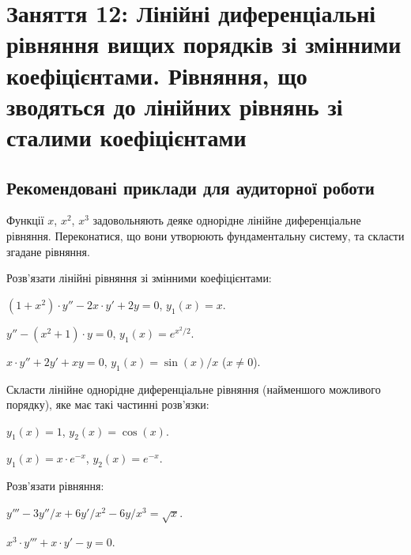 \section*{Заняття 12: Лінійні диференціальні рівняння вищих порядків зі змінними коефіцієнтами. Рівняння, що зводяться до лінійних рівнянь зі сталими коефіцієнтами}

\subsection*{Рекомендовані приклади для аудиторної роботи}

\begin{problem}
	Функції $x$, $x^2$, $x^3$ задовольняють деяке однорідне лінійне диференціальне рівняння. Переконатися, що вони утворюють фундаментальну систему, та скласти згадане рівняння.
\end{problem}

Розв'язати лінійні рівняння зі змінними коефіцієнтами:

\begin{problem}
	$(1 + x^2) \cdot y'' - 2 x \cdot y' + 2 y = 0$, $y_1(x) = x$.
\end{problem}

\begin{problem}
	$y'' - (x^2 + 1) \cdot y = 0$, $y_1(x) = e^{x^2 / 2}$.
\end{problem}

\begin{problem}
	$x \cdot y'' + 2 y' + x y = 0$, $y_1(x) = \sin (x) / x$ ($x \ne 0$).
\end{problem}

Скласти лінійне однорідне диференціальне рівняння (найменшого можливого порядку), яке має такі частинні розв'язки:

\begin{problem}
	$y_1(x) = 1$, $y_2(x) = \cos (x)$.
\end{problem}

\begin{problem}
	$y_1(x) = x \cdot e^{-x}$, $y_2(x) = e^{-x}$.
\end{problem}

Розв'язати рівняння:

\begin{problem}
	$y''' - 3 y'' / x + 6 y' / x^2 - 6 y / x^3 = \sqrt{x}$.
\end{problem}

\begin{problem}
	$x^3 \cdot y''' + x \cdot y' - y = 0$.
\end{problem}

